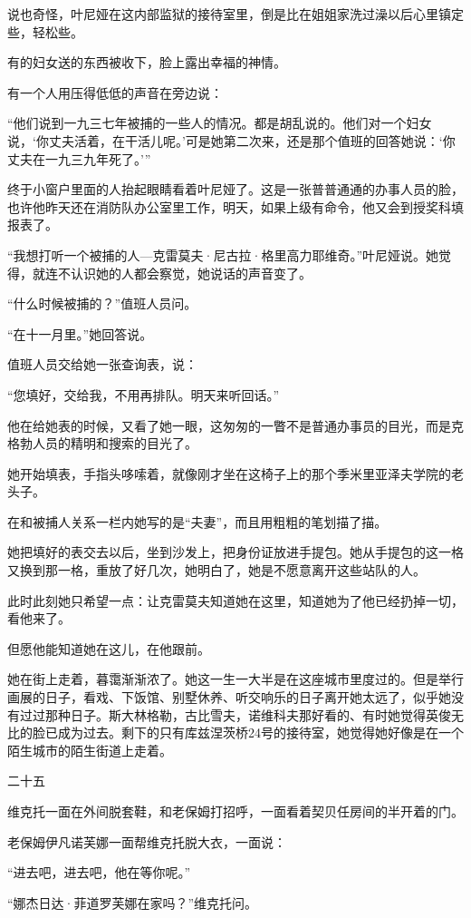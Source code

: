 说也奇怪，叶尼娅在这内部监狱的接待室里，倒是比在姐姐家洗过澡以后心里镇定些，轻松些。

有的妇女送的东西被收下，脸上露出幸福的神情。

有一个人用压得低低的声音在旁边说：

“他们说到一九三七年被捕的一些人的情况。都是胡乱说的。他们对一个妇女说，‘你丈夫活着，在干活儿呢。’可是她第二次来，还是那个值班的回答她说：‘你丈夫在一九三九年死了。’”

终于小窗户里面的人抬起眼睛看着叶尼娅了。这是一张普普通通的办事人员的脸，也许他昨天还在消防队办公室里工作，明天，如果上级有命令，他又会到授奖科填报表了。

“我想打听一个被捕的人—克雷莫夫·尼古拉·格里高力耶维奇。”叶尼娅说。她觉得，就连不认识她的人都会察觉，她说话的声音变了。

“什么时候被捕的？”值班人员问。

“在十一月里。”她回答说。

值班人员交给她一张查询表，说：

“您填好，交给我，不用再排队。明天来听回话。”

他在给她表的时候，又看了她一眼，这匆匆的一瞥不是普通办事员的目光，而是克格勃人员的精明和搜索的目光了。

她开始填表，手指头哆嗦着，就像刚才坐在这椅子上的那个季米里亚泽夫学院的老头子。

在和被捕人关系一栏内她写的是“夫妻”，而且用粗粗的笔划描了描。

她把填好的表交去以后，坐到沙发上，把身份证放进手提包。她从手提包的这一格又换到那一格，重放了好几次，她明白了，她是不愿意离开这些站队的人。

此时此刻她只希望一点：让克雷莫夫知道她在这里，知道她为了他已经扔掉一切，看他来了。

但愿他能知道她在这儿，在他跟前。

她在街上走着，暮霭渐渐浓了。她这一生一大半是在这座城市里度过的。但是举行画展的日子，看戏、下饭馆、别墅休养、听交响乐的日子离开她太远了，似乎她没有过过那种日子。斯大林格勒，古比雪夫，诺维科夫那好看的、有时她觉得英俊无比的脸已成为过去。剩下的只有库兹涅茨桥24号的接待室，她觉得她好像是在一个陌生城市的陌生街道上走着。

二十五

维克托一面在外间脱套鞋，和老保姆打招呼，一面看着契贝任房间的半开着的门。

老保姆伊凡诺芙娜一面帮维克托脱大衣，一面说：

“进去吧，进去吧，他在等你呢。”

“娜杰日达·菲道罗芙娜在家吗？”维克托问。

